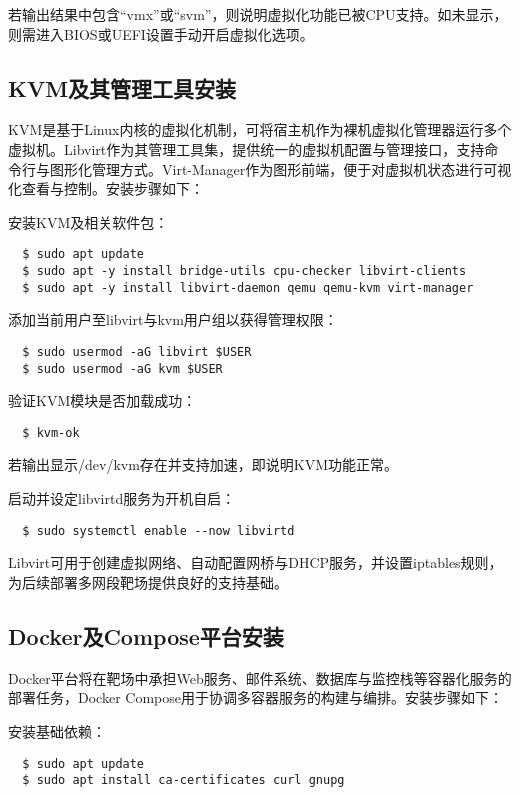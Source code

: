 \documentclass[lang=cn,10pt]{elegantbook}
\begin{document}
若输出结果中包含“vmx”或“svm”，则说明虚拟化功能已被CPU支持。如未显示，则需进入BIOS或UEFI设置手动开启虚拟化选项。

\subsection{KVM及其管理工具安装}

KVM是基于Linux内核的虚拟化机制，可将宿主机作为裸机虚拟化管理器运行多个虚拟机。Libvirt作为其管理工具集，提供统一的虚拟机配置与管理接口，支持命令行与图形化管理方式。Virt-Manager作为图形前端，便于对虚拟机状态进行可视化查看与控制。安装步骤如下：

安装KVM及相关软件包：

\begin{verbatim}
  $ sudo apt update
  $ sudo apt -y install bridge-utils cpu-checker libvirt-clients 
  $ sudo apt -y install libvirt-daemon qemu qemu-kvm virt-manager
\end{verbatim}

添加当前用户至libvirt与kvm用户组以获得管理权限：

\begin{verbatim}
  $ sudo usermod -aG libvirt $USER
  $ sudo usermod -aG kvm $USER
\end{verbatim}

验证KVM模块是否加载成功：

\begin{verbatim}
  $ kvm-ok
\end{verbatim}

若输出显示/dev/kvm存在并支持加速，即说明KVM功能正常。

启动并设定libvirtd服务为开机自启：

\begin{verbatim}
  $ sudo systemctl enable --now libvirtd
\end{verbatim}

Libvirt可用于创建虚拟网络、自动配置网桥与DHCP服务，并设置iptables规则，为后续部署多网段靶场提供良好的支持基础。

\subsection{Docker及Compose平台安装}

Docker平台将在靶场中承担Web服务、邮件系统、数据库与监控栈等容器化服务的部署任务，Docker Compose用于协调多容器服务的构建与编排。安装步骤如下：

安装基础依赖：

\begin{verbatim}
  $ sudo apt update
  $ sudo apt install ca-certificates curl gnupg
\end{verbatim}
\end{document}
